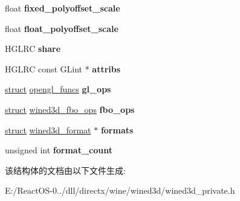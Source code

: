 \begin{DoxyCompactItemize}
float {\bfseries fixed\+\_\+polyoffset\+\_\+scale}
\item 
\mbox{\label{structwined3d__gl__info_a7e6d6e105ceffa141399d15c749ad6d5}} 
float {\bfseries float\+\_\+polyoffset\+\_\+scale}
\item 
\mbox{\label{structwined3d__gl__info_a8c8c32e8f580d11656454f6356bdc095}} 
H\+G\+L\+RC {\bfseries share}
\item 
\mbox{\label{structwined3d__gl__info_a3bb47541fb7888aa586cb8bf54e70e14}} 
H\+G\+L\+RC const G\+Lint $\ast$ {\bfseries attribs}
\item 
\mbox{\label{structwined3d__gl__info_a55376e47a7664b31204c048c0bc1a1c4}} 
\hyperlink{interfacestruct}{struct} \hyperlink{structopengl__funcs}{opengl\+\_\+funcs} {\bfseries gl\+\_\+ops}
\item 
\mbox{\label{structwined3d__gl__info_ac17b90bd43cdf4c68360f1fb613878f7}} 
\hyperlink{interfacestruct}{struct} \hyperlink{structwined3d__fbo__ops}{wined3d\+\_\+fbo\+\_\+ops} {\bfseries fbo\+\_\+ops}
\item 
\mbox{\label{structwined3d__gl__info_aa68569ac9f3ed4b531d5c5aa529a7a0d}} 
\hyperlink{interfacestruct}{struct} \hyperlink{structwined3d__format}{wined3d\+\_\+format} $\ast$ {\bfseries formats}
\item 
\mbox{\label{structwined3d__gl__info_a212537802a21c0f05433d0cb4577a933}} 
unsigned int {\bfseries format\+\_\+count}
\end{DoxyCompactItemize}


该结构体的文档由以下文件生成\+:\begin{DoxyCompactItemize}
\item 
E\+:/\+React\+O\+S-\/0../dll/directx/wine/wined3d/wined3d\+\_\+private.\+h\end{DoxyCompactItemize}
